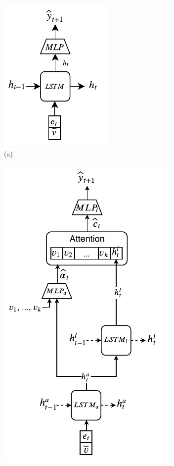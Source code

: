 \begin{figure}[th]
	\begin{minipage}{.19\textwidth}
		\centering
		\vspace{7mm}
		\includegraphics[scale=0.65]{studies/inlg2019/figures/simple_no_attention_no_location.pdf} \\
		\vspace{4mm}
		(a)
	\end{minipage}%
	\begin{minipage}{.20\textwidth}
		\centering
		\includegraphics[scale=0.43]{studies/inlg2019/figures/bottom-up.pdf}\\

\end{minipage}
\end{figure}
